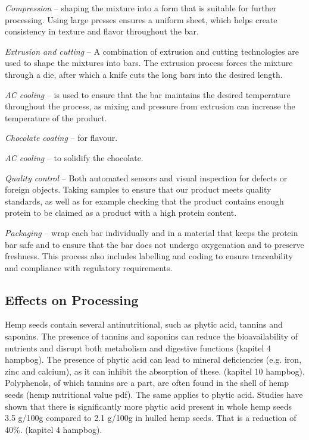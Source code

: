 \vspace{1em}
\textit{Compression} – shaping the mixture into a form that is suitable for further processing. Using large presses ensures a uniform sheet, which helps create consistency in texture and flavor throughout the bar.

\vspace{1em}
\textit{Extrusion and cutting} – A combination of extrusion and cutting technologies are used to shape the mixtures into bars. The extrusion process forces the mixture through a die, after which a knife cuts the long bars into the desired length.

\vspace{1em}
\textit{AC cooling} – is used to ensure that the bar maintains the desired temperature throughout the process, as mixing and pressure from extrusion can increase the temperature of the product.

\vspace{1em}
\textit{Chocolate coating} – for flavour.

\vspace{1em}
\textit{AC cooling} – to solidify the chocolate.

\vspace{1em}
\textit{Quality control} – Both automated sensors and visual inspection for defects or foreign objects. Taking samples to ensure that our product meets quality standards, as well as for example checking that the product contains enough protein to be claimed as a product with a high protein content. 

\vspace{1em}
\textit{Packaging} – wrap each bar individually and in a material that keeps the protein bar safe and to ensure that the bar does not undergo oxygenation and to preserve freshness. This process also includes labelling and coding to ensure traceability and compliance with regulatory requirements.

\subsection{Effects on Processing}
Hemp seeds contain several antinutritional, such as phytic acid, tannins and saponins. The presence of tannins and saponins can reduce the bioavailability of nutrients and disrupt both metabolism and digestive functions (kapitel 4 hampbog). The presence of phytic acid can lead to mineral deficiencies (e.g. iron, zinc and calcium), as it can inhibit the absorption of these. (kapitel 10 hampbog). Polyphenols, of which tannins are a part, are often found in the shell of hemp seeds (hemp nutritional value pdf). The same applies to phytic acid. Studies have shown that there is significantly more phytic acid present in whole hemp seeds 3.5 g/100g compared to 2.1 g/100g in hulled hemp seeds. That is a reduction of 40\%. (kapitel 4 hampbog).

